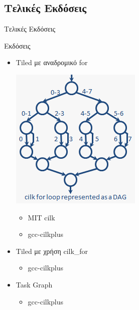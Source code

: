 \documentclass{beamer}
\begin{document}
\subsection{Τελικές Εκδόσεις}
\begin{frame}{Τελικές Εκδόσεις}
    \begin{block}{Εκδόσεις }
        \begin{itemize}
                
            \item<1-> \begin{minipage}{0.7\textwidth}
                    Tiled με αναδρομικό for
                \end{minipage}
                \begin{minipage}[h]{0.1\textwidth}
                \begin{flushright}
                        \includegraphics[scale=0.45]{files/rec_for.png}
                \end{flushright}
                \end{minipage}
                    \begin{itemize}
                        \item<2-> MIT cilk
                        \item<3-> gcc-cilkplus
                    \end{itemize}
            \item<4-> Tiled με χρήση cilk\_for
                \begin{itemize}
                    \item<5-> gcc-cilkplus
                \end{itemize}
            \item<6-> Task Graph
                \begin{itemize}
                    \item<7-> gcc-cilkplus
                \end{itemize}
        \end{itemize}
    \end{block}
\end{frame}
\end{document}
